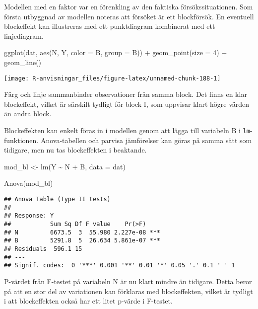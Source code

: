 \documentclass[
]{book}
\newenvironment{Shaded}{\begin{snugshade}}{\end{snugshade}}
\newcommand{\AttributeTok}[1]{\textcolor[rgb]{0.77,0.63,0.00}{#1}}
\newcommand{\DecValTok}[1]{\textcolor[rgb]{0.00,0.00,0.81}{#1}}
\newcommand{\FunctionTok}[1]{\textcolor[rgb]{0.00,0.00,0.00}{#1}}
\newcommand{\NormalTok}[1]{#1}
\newcommand{\OtherTok}[1]{\textcolor[rgb]{0.56,0.35,0.01}{#1}}
\newcommand{\SpecialCharTok}[1]{\textcolor[rgb]{0.00,0.00,0.00}{#1}}
\theoremstyle{definition}
\theoremstyle{definition}
\theoremstyle{definition}
\theoremstyle{definition}
\theoremstyle{remark}
\begin{document}
Modellen med en faktor var en förenkling av den faktiska försökssituationen. Som första utbyggnad av modellen noteras att försöket är ett blockförsök. En eventuell blockeffekt kan illustreras med ett punktdiagram kombinerat med ett linjediagram.

\begin{Shaded}
\begin{Highlighting}[]
\FunctionTok{ggplot}\NormalTok{(dat, }\FunctionTok{aes}\NormalTok{(N, Y, }\AttributeTok{color =}\NormalTok{ B, }\AttributeTok{group =}\NormalTok{ B)) }\SpecialCharTok{+}
  \FunctionTok{geom\_point}\NormalTok{(}\AttributeTok{size =} \DecValTok{4}\NormalTok{) }\SpecialCharTok{+}
  \FunctionTok{geom\_line}\NormalTok{()}
\end{Highlighting}
\end{Shaded}

\begin{center}\texttt{[image: R-anvisningar\_files/figure-latex/unnamed-chunk-188-1]} \end{center}

Färg och linje sammanbinder observationer från samma block. Det finns en klar blockeffekt, vilket är särskilt tydligt för block I, som uppvisar klart högre värden än andra block.

Blockeffekten kan enkelt föras in i modellen genom att lägga till variabeln B i \texttt{lm}-funktionen. Anova-tabellen och parvisa jämförelser kan göras på samma sätt som tidigare, men nu tas blockeffekten i beaktande.

\begin{Shaded}
\begin{Highlighting}[]
\NormalTok{mod\_bl }\OtherTok{\textless{}{-}} \FunctionTok{lm}\NormalTok{(Y }\SpecialCharTok{\textasciitilde{}}\NormalTok{ N }\SpecialCharTok{+}\NormalTok{ B, }\AttributeTok{data =}\NormalTok{ dat)}

\FunctionTok{Anova}\NormalTok{(mod\_bl)}
\end{Highlighting}
\end{Shaded}

\begin{verbatim}
## Anova Table (Type II tests)
## 
## Response: Y
##           Sum Sq Df F value    Pr(>F)    
## N         6673.5  3  55.980 2.227e-08 ***
## B         5291.8  5  26.634 5.861e-07 ***
## Residuals  596.1 15                      
## ---
## Signif. codes:  0 '***' 0.001 '**' 0.01 '*' 0.05 '.' 0.1 ' ' 1
\end{verbatim}

P-värdet från F-testet på variabeln N är nu klart mindre än tidigare. Detta beror på att en stor del av variationen kan förklaras med blockeffekten, vilket är tydligt i att blockeffekten också har ett litet p-värde i F-testet.
\end{document}
